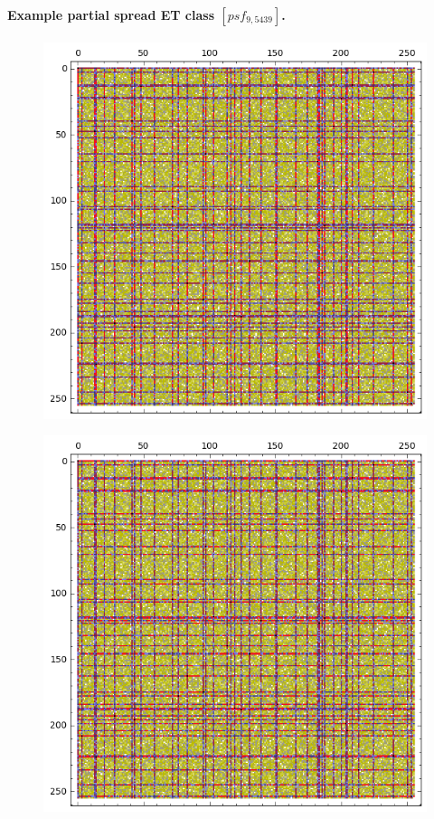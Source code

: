 \documentclass[12pt,a4paper]{article}
\begin{document}
\paragraph*{Example partial spread ET class $[psf_{9,5439}]$.}
\begin{figure}[!hb]
\centering
\begin{minipage}{.48\textwidth}
  \centering
  \includegraphics[width=.9\linewidth]{../matrix_plot/psf_9_5439_bent_cayley_graph_index_matrix.png}
  \label{fig:psf_9_5439_bent_cayley_graph_index_matrix}
\end{minipage}
\begin{minipage}{.48\textwidth}
  \centering
  \includegraphics[width=.9\linewidth]{../matrix_plot/psf_9_5439_dual_cayley_graph_index_matrix.png}
  \label{fig:psf_9_5439_dual_cayley_graph_index_matrix}
\end{minipage}%
\end{figure}
\end{document}

